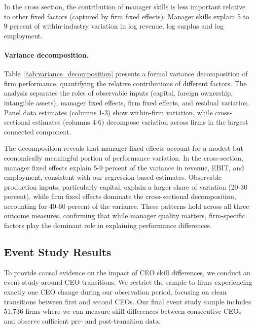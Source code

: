\documentclass[11pt,a4paper]{article}
\begin{document}
In the cross section, the contribution of manager skills is less important relative to other fixed factors (captured by firm fixed effects). Manager skills explain 5 to 9 percent of within-industry variation in log revenue, log surplus and log employment.

\paragraph{Variance decomposition.} Table~\ref{tab:variance_decomposition} presents a formal variance decomposition of firm performance, quantifying the relative contributions of different factors. The analysis separates the roles of observable inputs (capital, foreign ownership, intangible assets), manager fixed effects, firm fixed effects, and residual variation. Panel data estimates (columns 1-3) show within-firm variation, while cross-sectional estimates (columns 4-6) decompose variation across firms in the largest connected component.

The decomposition reveals that manager fixed effects account for a modest but economically meaningful portion of performance variation. In the cross-section, manager fixed effects explain 5-9 percent of the variance in revenue, EBIT, and employment, consistent with our regression-based estimates. Observable production inputs, particularly capital, explain a larger share of variation (20-30 percent), while firm fixed effects dominate the cross-sectional decomposition, accounting for 40-60 percent of the variance. These patterns hold across all three outcome measures, confirming that while manager quality matters, firm-specific factors play the dominant role in explaining performance differences.



\subsection{Event Study Results}

To provide causal evidence on the impact of CEO skill differences, we conduct an event study around CEO transitions. We restrict the sample to firms experiencing exactly one CEO change during our observation period, focusing on clean transitions between first and second CEOs. Our final event study sample includes 51,736 firms where we can measure skill differences between consecutive CEOs and observe sufficient pre- and post-transition data.
\end{document}
